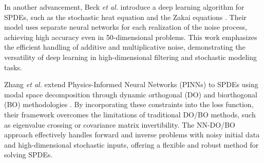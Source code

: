 In another advancement, Beck \textit{et al.} introduce a deep learning algorithm for SPDEs, such as the stochastic heat equation and the Zakai equations \cite{nn-spde-2}. Their model uses separate neural networks for each realization of the noise process, achieving high accuracy even in 50-dimensional problems. This work emphasizes the efficient handling of additive and multiplicative noise, demonstrating the versatility of deep learning in high-dimensional filtering and stochastic modeling tasks.

Zhang \textit{et al.} extend Physics-Informed Neural Networks (PINNs) to SPDEs using modal space decomposition through dynamic orthogonal (DO) and biorthogonal (BO) methodologies \cite{nn-spde-1}. By incorporating these constraints into the loss function, their framework overcomes the limitations of traditional DO/BO methods, such as eigenvalue crossing or covariance matrix invertibility. The NN-DO/BO approach effectively handles forward and inverse problems with noisy initial data and high-dimensional stochastic inputs, offering a flexible and robust method for solving SPDEs.